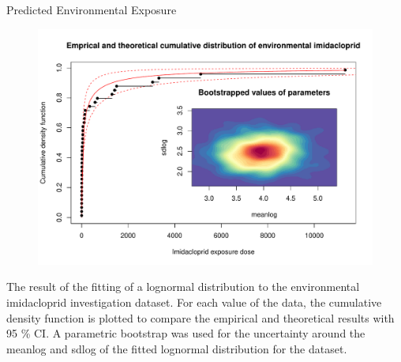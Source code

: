 \documentclass[final,t]{beamer}
\begin{document}
\begin{frame}[fragile]
\begin{columns}[t]
    \begin{column}{0.24\linewidth}
      \begin{block}{Predicted Environmental Exposure}
      
      \begin{figure}[htb]
      \includegraphics[width=.9\columnwidth]{fig3}
      \end{figure}
      The result of the fitting of a lognormal distribution to the environmental imidacloprid investigation dataset. For each value of the data, the cumulative density function is plotted to compare the empirical and theoretical results with 95 \% CI. A parametric bootstrap was used for the uncertainty around the meanlog and sdlog of the fitted lognormal distribution for the dataset.
      \end{block}


\end{column}
\end{columns}
\end{frame}
\end{document}
